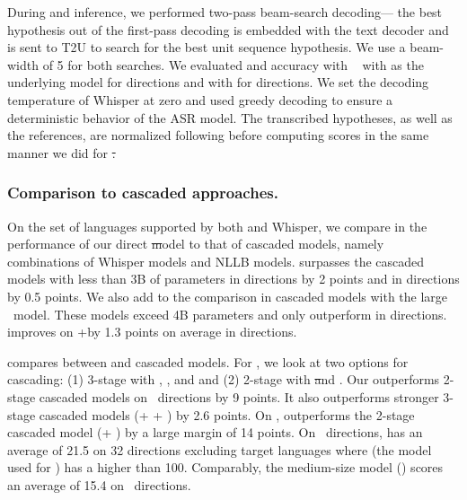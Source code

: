 During \sst and \ttst inference, we performed two-pass beam-search decoding— 
the best hypothesis out of the first-pass decoding is embedded with the text decoder and is sent to T2U to search for the best unit sequence hypothesis. We use a beam-width of 5 for both searches. We evaluated \sst and \ttst accuracy with \asrbleu~\citep{lee-etal-2022-direct} with \whisperlarge as the underlying \asr model for \engx directions and with \whispermedium for \xeng directions. We set the decoding temperature of Whisper at zero and used greedy decoding to ensure a deterministic behavior of the ASR model.
The transcribed hypotheses, as well as the references, are normalized following \cite{whisper} before computing \bleu scores in the same manner we did for \st. 


\subsubsection{Comparison to cascaded approaches.}
On the set of languages supported by both \mfourt and Whisper, we compare in  the performance of our direct \st model to that of cascaded models, namely combinations of Whisper \asr models and NLLB \mt models.
%
\mfourtlg surpasses the cascaded models with less than 3B of parameters  in \xeng directions by 2 \bleu points and in \engx directions by 0.5 \bleu points. We also add to the comparison in  cascaded models with the large \nllbmedium~\mt model. These models exceed 4B parameters and only outperform \mfourtlg in \engx directions. \mfourtlg improves on \whisperlarge+\nllbmedium by 1.3 \bleu points on average in \xeng directions.

 compares \sst between \mfourtlg and cascaded models. For \sst, we look at two options for cascading: (1) 3-stage with \asr, \mt, and \tts and (2) 2-stage with \st and \tts. 
Our \mfourtlg outperforms 2-stage cascaded models on \fleurs~\xeng directions by 9 \asrbleu points. It also outperforms stronger 3-stage cascaded models (\whisperlarge + \nllbmedium  + \yourtts) by 2.6 \asrbleu points. On \cvss, \mfourtlg outperforms the 2-stage cascaded model (\whisperlarge + \yourtts) by a large margin of 14 \asrbleu points. 
On \fleurs~\engx directions, \mfourtlg has an average \asrbleu of 21.5 on 32 \xeng directions excluding target languages where \whisperlarge (the \asr model used for \asrbleu) has a \wer higher than 100. Comparably, the medium-size model (\mfourtmd) scores an average \asrbleu of 15.4 on \sst~\engx directions.

